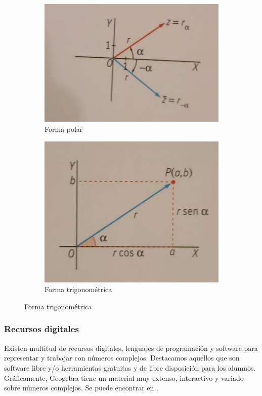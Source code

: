 \documentclass[../main.tex]{memoir}
\begin{document}
\begin{figure}[H]
	\centering
	\begin{subfigure}{0.48\textwidth}
		\centering
		\includegraphics[width=\linewidth]{images/polar.jpg}
		\caption{Forma polar}
	\end{subfigure}
	\begin{subfigure}{0.48\textwidth}
		\centering
		\includegraphics[scale=0.39]{images/trigonometrica.jpg}
		\caption{Forma trigonométrica}
	\end{subfigure}
	\label{fig:representacion3}
\end{figure}

\subsubsection{Recursos digitales}

Existen multitud de recursos digitales, lenguajes de programación y software para representar y trabajar con números complejos. Destacamos aquellos que son software libre y/o herramientas gratuitas y de libre disposición para los alumnos. Gráficamente, Geogebra tiene un material muy extenso, interactivo y variado sobre números complejos. Se puede encontrar en \cite{materialgeogebra}.
\end{document}
